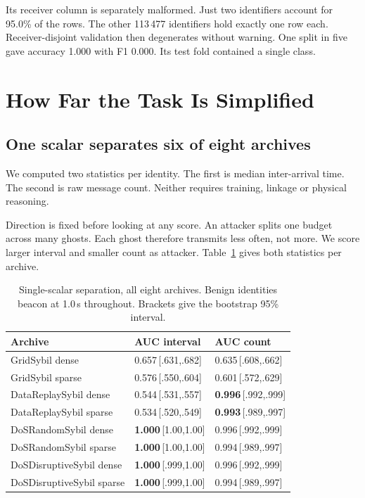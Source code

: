\documentclass[conference]{IEEEtran}
\begin{document}
Its receiver column is separately malformed.
Just two identifiers account for 95.0\% of the rows.
The other 113\,477 identifiers hold exactly one row each.
Receiver-disjoint validation then degenerates without warning.
One split in five gave accuracy 1.000 with F1 0.000.
Its test fold contained a single class.

\section{How Far the Task Is Simplified}

\subsection{One scalar separates six of eight archives}

We computed two statistics per identity.
The first is median inter-arrival time.
The second is raw message count.
Neither requires training, linkage or physical reasoning.

Direction is fixed before looking at any score.
An attacker splits one budget across many ghosts.
Each ghost therefore transmits less often, not more.
We score larger interval and smaller count as attacker.
Table~\ref{tab:scalar} gives both statistics per archive.

\begin{table}[t]
\caption{Single-scalar separation, all eight archives.
Benign identities beacon at 1.0\,s throughout.
Brackets give the bootstrap 95\% interval.}
\label{tab:scalar}
\centering
\footnotesize
\begin{tabular}{lll}
\toprule
Archive & AUC interval & AUC count \\
\midrule
GridSybil dense           & 0.657\,[.631,.682] & 0.635\,[.608,.662] \\
GridSybil sparse          & 0.576\,[.550,.604] & 0.601\,[.572,.629] \\
DataReplaySybil dense     & 0.544\,[.531,.557] & \textbf{0.996}\,[.992,.999] \\
DataReplaySybil sparse    & 0.534\,[.520,.549] & \textbf{0.993}\,[.989,.997] \\
DoSRandomSybil dense      & \textbf{1.000}\,[1.00,1.00] & 0.996\,[.992,.999] \\
DoSRandomSybil sparse     & \textbf{1.000}\,[1.00,1.00] & 0.994\,[.989,.997] \\
DoSDisruptiveSybil dense  & \textbf{1.000}\,[.999,1.00] & 0.996\,[.992,.999] \\
DoSDisruptiveSybil sparse & \textbf{1.000}\,[.999,1.00] & 0.994\,[.989,.997] \\
\bottomrule
\end{tabular}
\end{table}
\end{document}

